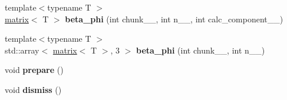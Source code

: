 \begin{DoxyCompactItemize}
\item 
\hypertarget{classsirius_1_1_beta__projectors__gradient_ab4692e07fc2803b13926282778ab8b8a}{}{\footnotesize template$<$typename T $>$ }\\\hyperlink{classsddk_1_1mdarray}{matrix}$<$ T $>$ {\bfseries beta\+\_\+phi} (int chunk\+\_\+\+\_\+, int n\+\_\+\+\_\+, int calc\+\_\+component\+\_\+\+\_\+)\label{classsirius_1_1_beta__projectors__gradient_ab4692e07fc2803b13926282778ab8b8a}

\item 
\hypertarget{classsirius_1_1_beta__projectors__gradient_ac294878106e6edf7508e0f0433fc4beb}{}{\footnotesize template$<$typename T $>$ }\\std\+::array$<$ \hyperlink{classsddk_1_1mdarray}{matrix}$<$ T $>$, 3 $>$ {\bfseries beta\+\_\+phi} (int chunk\+\_\+\+\_\+, int n\+\_\+\+\_\+)\label{classsirius_1_1_beta__projectors__gradient_ac294878106e6edf7508e0f0433fc4beb}

\item 
\hypertarget{classsirius_1_1_beta__projectors__gradient_a14de36153d5ba3367ccf4fb5e286aee3}{}void {\bfseries prepare} ()\label{classsirius_1_1_beta__projectors__gradient_a14de36153d5ba3367ccf4fb5e286aee3}

\item 
\hypertarget{classsirius_1_1_beta__projectors__gradient_aa64e477680bbea3a75ac481809d74875}{}void {\bfseries dismiss} ()\label{classsirius_1_1_beta__projectors__gradient_aa64e477680bbea3a75ac481809d74875}

\end{DoxyCompactItemize}
